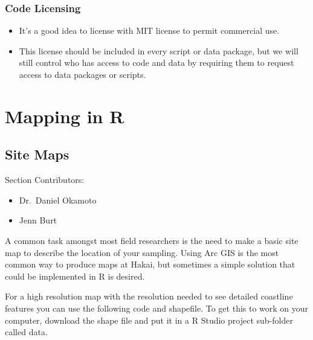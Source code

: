 \documentclass[]{book}
\providecommand{\tightlist}{%
  \setlength{\itemsep}{0pt}\setlength{\parskip}{0pt}}
\begin{document}
\subsection{Code Licensing}\label{code-licensing}

\begin{itemize}
\item
  It's a good idea to license with MIT license to permit commercial use.
\item
  This license should be included in every script or data package, but
  we will still control who has access to code and data by requiring
  them to request access to data packages or scripts.
\end{itemize}

\chapter{Mapping in R}\label{mapping-in-r}

\section{Site Maps}\label{site-maps}

Section Contributors:

\begin{itemize}
\tightlist
\item
  Dr.~Daniel Okamoto
\item
  Jenn Burt
\end{itemize}

A common task amongst most field researchers is the need to make a basic
site map to describe the location of your sampling. Using Arc GIS is the
most common way to produce maps at Hakai, but sometimes a simple
solution that could be implemented in R is desired.

For a high resolution map with the resolution needed to see detailed
coastline features you can use the following code and shapefile. To get
this to work on your computer, download the shape file and put it in a R
Studio project sub-folder called data.
\end{document}
